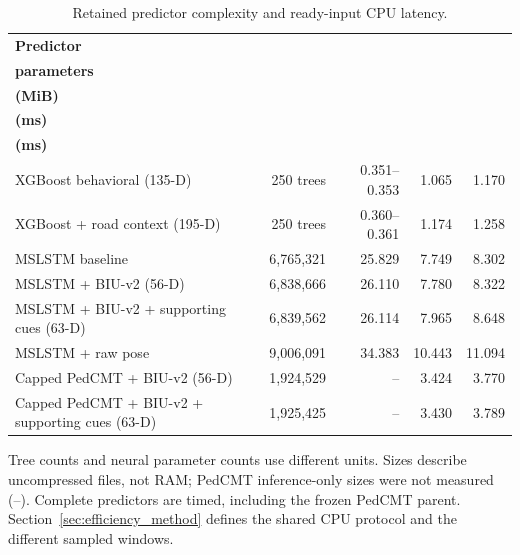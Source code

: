\begin{table}[!htbp]
\centering
\caption{Retained predictor complexity and ready-input CPU latency.}\label{tab:ch4_model_size}
\small
\begin{tabularx}{\textwidth}{@{}Xrrrr@{}}\toprule
\textbf{Predictor} & \shortstack{\textbf{Trees /}\\\textbf{parameters}} & \shortstack{\textbf{Size}\\\textbf{(MiB)}} & \shortstack{\textbf{Mean}\\\textbf{(ms)}} & \shortstack{\textbf{p95}\\\textbf{(ms)}}\\[3pt]
\midrule
XGBoost behavioral (\mbox{135-D}) & 250 trees & 0.351--0.353 & 1.065 & 1.170\\[3pt]
XGBoost + road context (\mbox{195-D}) & 250 trees & 0.360--0.361 & 1.174 & 1.258\\[3pt]
MSLSTM baseline & 6,765,321 & 25.829 & 7.749 & 8.302\\[3pt]
MSLSTM + BIU-v2 (56-D) & 6,838,666 & 26.110 & 7.780 & 8.322\\[3pt]
MSLSTM + BIU-v2 + supporting cues (63-D) & 6,839,562 & 26.114 & 7.965 & 8.648\\[3pt]
MSLSTM + raw pose & 9,006,091 & 34.383 & 10.443 & 11.094\\[3pt]
Capped PedCMT + BIU-v2 (56-D) & 1,924,529 & -- & 3.424 & 3.770\\[3pt]
Capped PedCMT + BIU-v2 + supporting cues (63-D) & 1,925,425 & -- & 3.430 & 3.789\\[3pt]
\bottomrule
\end{tabularx}
\smallskip
\begin{minipage}{\textwidth}\footnotesize
Tree counts and neural parameter counts use different units. Sizes describe uncompressed
files, not RAM; PedCMT inference-only sizes were not measured (--). Complete predictors
are timed, including the frozen PedCMT parent. Section~\ref{sec:efficiency_method}
defines the shared CPU protocol and the different sampled windows.
\end{minipage}
\end{table}
